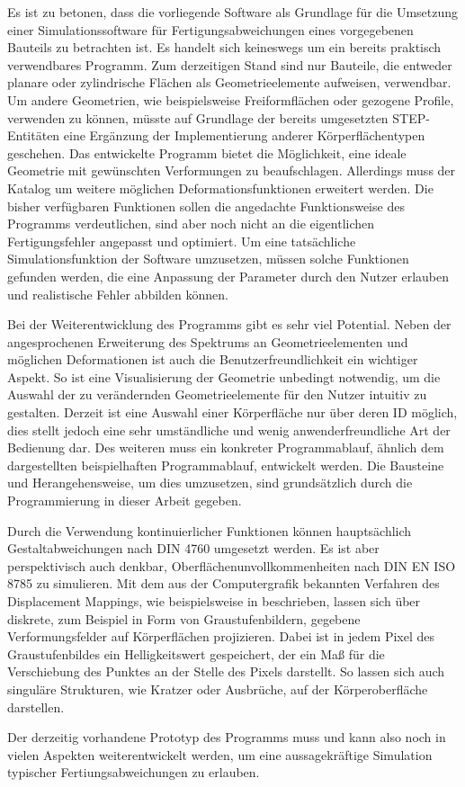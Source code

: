 Es ist zu betonen, dass die vorliegende Software als Grundlage für die Umsetzung einer Simulationssoftware für Fertigungsabweichungen eines vorgegebenen Bauteils zu betrachten ist. Es handelt sich keineswegs um ein bereits praktisch verwendbares Programm.   
Zum derzeitigen Stand sind nur Bauteile, die entweder planare  oder zylindrische Flächen als Geometrieelemente aufweisen, verwendbar. Um andere Geometrien, wie beispielsweise Freiformflächen oder gezogene Profile, verwenden zu können, müsste auf Grundlage der bereits umgesetzten STEP-Entitäten eine Ergänzung der Implementierung anderer Körperflächentypen geschehen. 
Das entwickelte Programm bietet die Möglichkeit, eine ideale Geometrie mit gewünschten Verformungen zu beaufschlagen. Allerdings muss der Katalog um weitere möglichen Deformationsfunktionen erweitert werden. Die bisher verfügbaren Funktionen sollen die angedachte Funktionsweise des Programms verdeutlichen, sind aber noch nicht an die eigentlichen Fertigungsfehler angepasst und optimiert. Um eine tatsächliche Simulationsfunktion der Software umzusetzen, müssen solche Funktionen gefunden werden, die eine Anpassung der Parameter durch den Nutzer erlauben und realistische Fehler abbilden können. 

Bei der Weiterentwicklung des Programms gibt es sehr viel Potential. Neben der angesprochenen Erweiterung des Spektrums an Geometrieelementen und möglichen Deformationen ist auch die Benutzerfreundlichkeit ein wichtiger Aspekt. So ist eine Visualisierung der Geometrie unbedingt notwendig, um die Auswahl der zu verändernden Geometrieelemente für den Nutzer intuitiv zu gestalten. Derzeit ist eine Auswahl einer Körperfläche nur über deren ID möglich, dies stellt jedoch eine sehr umständliche und wenig anwenderfreundliche Art der Bedienung dar. Des weiteren muss ein konkreter Programmablauf, ähnlich dem dargestellten beispielhaften Programmablauf, entwickelt werden. Die Bausteine und Herangehensweise, um dies umzusetzen, sind grundsätzlich durch die Programmierung in dieser Arbeit gegeben.    

Durch die Verwendung kontinuierlicher Funktionen können hauptsächlich Gestaltabweichungen nach DIN 4760 \cite{DIN.4760} umgesetzt werden. Es ist aber perspektivisch auch denkbar, Oberflächenunvollkommenheiten nach DIN EN ISO 8785 \cite{DIN.8785} zu simulieren. Mit dem aus der Computergrafik bekannten Verfahren des Displacement Mappings, wie beispielsweise in \cite{Kalos.2008} beschrieben, lassen sich über diskrete, zum Beispiel in Form von Graustufenbildern, gegebene Verformungsfelder auf Körperflächen projizieren. Dabei ist in jedem Pixel des Graustufenbildes ein Helligkeitswert gespeichert, der ein Maß für die Verschiebung des Punktes an der Stelle des Pixels darstellt. So lassen sich auch singuläre Strukturen, wie Kratzer oder Ausbrüche, auf der Körperoberfläche darstellen. 

Der derzeitig vorhandene Prototyp des Programms muss und kann also noch in vielen Aspekten weiterentwickelt werden, um eine aussagekräftige Simulation typischer Fertiungsabweichungen zu erlauben.    

      



          